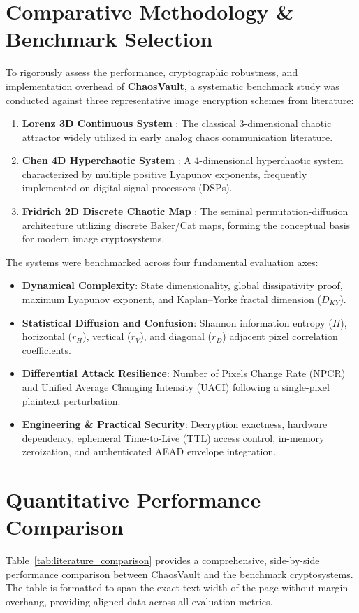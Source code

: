 \documentclass[12pt,a4paper,oneside]{report}
\begin{document}
\section{Comparative Methodology \& Benchmark Selection}
To rigorously assess the performance, cryptographic robustness, and implementation overhead of \textbf{ChaosVault}, a systematic benchmark study was conducted against three representative image encryption schemes from literature:
\begin{enumerate}
    \item \textbf{Lorenz 3D Continuous System} \cite{pecora1990}: The classical 3-dimensional chaotic attractor widely utilized in early analog chaos communication literature.
    \item \textbf{Chen 4D Hyperchaotic System} \cite{wu2011}: A 4-dimensional hyperchaotic system characterized by multiple positive Lyapunov exponents, frequently implemented on digital signal processors (DSPs).
    \item \textbf{Fridrich 2D Discrete Chaotic Map} \cite{fridrich1998}: The seminal permutation-diffusion architecture utilizing discrete Baker/Cat maps, forming the conceptual basis for modern image cryptosystems.
\end{enumerate}

The systems were benchmarked across four fundamental evaluation axes:
\begin{itemize}
    \item \textbf{Dynamical Complexity}: State dimensionality, global dissipativity proof, maximum Lyapunov exponent, and Kaplan--Yorke fractal dimension ($D_{KY}$).
    \item \textbf{Statistical Diffusion and Confusion}: Shannon information entropy ($H$), horizontal ($r_H$), vertical ($r_V$), and diagonal ($r_D$) adjacent pixel correlation coefficients.
    \item \textbf{Differential Attack Resilience}: Number of Pixels Change Rate (NPCR) and Unified Average Changing Intensity (UACI) following a single-pixel plaintext perturbation.
    \item \textbf{Engineering \& Practical Security}: Decryption exactness, hardware dependency, ephemeral Time-to-Live (TTL) access control, in-memory zeroization, and authenticated AEAD envelope integration.
\end{itemize}

\section{Quantitative Performance Comparison}
Table~\ref{tab:literature_comparison} provides a comprehensive, side-by-side performance comparison between ChaosVault and the benchmark cryptosystems. The table is formatted to span the exact text width of the page without margin overhang, providing aligned data across all evaluation metrics.
\end{document}
